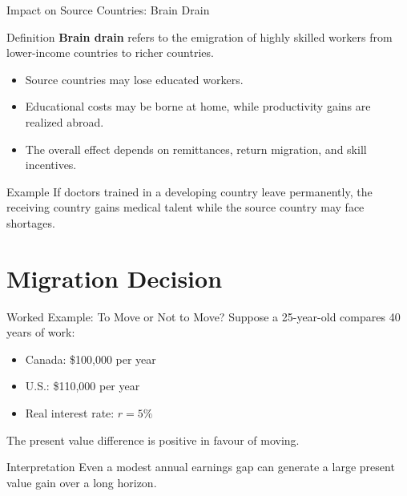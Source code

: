 \documentclass[aspectratio=169]{beamer}
\begin{document}
\begin{frame}{Impact on Source Countries: Brain Drain}
\transfade
\begin{block}{Definition}
\textbf{Brain drain} refers to the emigration of highly skilled workers from lower-income countries to richer countries.
\end{block}

\begin{itemize}
  \item Source countries may lose educated workers.
  \item Educational costs may be borne at home, while productivity gains are realized abroad.
  \item The overall effect depends on remittances, return migration, and skill incentives.
\end{itemize}

\begin{exampleblock}{Example}
If doctors trained in a developing country leave permanently, the receiving country gains medical talent while the source country may face shortages.
\end{exampleblock}
\end{frame}

\section{Migration Decision}

\begin{frame}{Worked Example: To Move or Not to Move?}
\transfade
Suppose a 25-year-old compares 40 years of work:

\begin{itemize}
  \item Canada: \$100,000 per year
  \item U.S.: \$110,000 per year
  \item Real interest rate: \(r = 5\%\)
\end{itemize}

The present value difference is positive in favour of moving.

\begin{block}{Interpretation}
Even a modest annual earnings gap can generate a large present value gain over a long horizon.
\end{block}
\end{frame}
\end{document}
